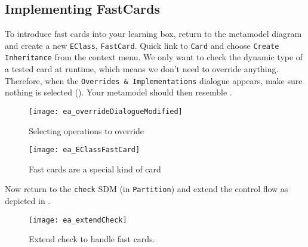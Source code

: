 \newpage
\subsection{Implementing FastCards}
\genHeader
\hypertarget{fastCard vis}{}

\begin{stepbystep}

\item To introduce fast cards into your learning box, return to the metamodel diagram and create a new \texttt{EClass},
\texttt{FastCard}. Quick link to \texttt{Card} and choose \texttt{Create Inheritance} from the context menu. We only want to check the dynamic type of a
tested card at runtime, which means we don't need to override anything. Therefore, when the \texttt{Overrides \& Implementations} dialogue appears, make sure
nothing is selected (). Your metamodel should then resemble .

\vspace{0.5cm}

\begin{figure}[htp]
\begin{center}
  \texttt{[image: ea\_overrideDialogueModified]}
  \caption{Selecting operations to override}  
  \label{ea:dialogue_override}
\end{center}
\end{figure}

\begin{figure}[htp]
\begin{center}
  \texttt{[image: ea\_EClassFastCard]}
  \caption{Fast cards are a special kind of card}  
  \label{ea:metamodel_FastCard}
\end{center}
\end{figure}

\vspace{0.5cm}

\item Now return to the \texttt{check} SDM (in \texttt{Partition}) and extend the control flow as depicted in
.

 \vspace{0.5cm}
 
\begin{figure}[htbp]
\begin{center}
  \texttt{[image: ea\_extendCheck]}
  \caption{Extend check to handle fast cards.}  
  \label{ea:extendCheck}
\end{center}
\end{figure}
 


\end{stepbystep}
